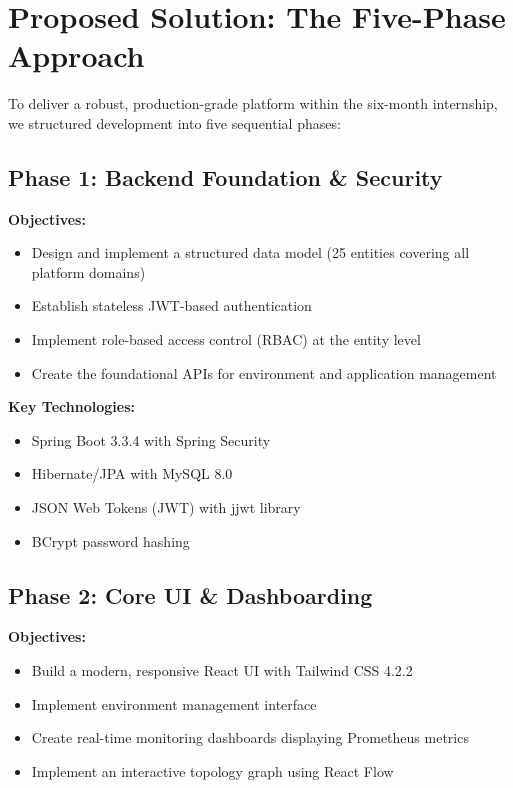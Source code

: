 \documentclass[12pt,a4paper]{report}
\begin{document}
\section{Proposed Solution: The Five-Phase Approach}

To deliver a robust, production-grade platform within the six-month internship, we structured development into five sequential phases:

\subsection{Phase 1: Backend Foundation \& Security}

\textbf{Objectives:}
\begin{itemize}
  \item Design and implement a structured data model (25 entities covering all platform domains)
  \item Establish stateless JWT-based authentication
  \item Implement role-based access control (RBAC) at the entity level
  \item Create the foundational APIs for environment and application management
\end{itemize}

\textbf{Key Technologies:}
\begin{itemize}
  \item Spring Boot 3.3.4 with Spring Security
  \item Hibernate/JPA with MySQL 8.0
  \item JSON Web Tokens (JWT) with jjwt library
  \item BCrypt password hashing
\end{itemize}

\subsection{Phase 2: Core UI \& Dashboarding}

\textbf{Objectives:}
\begin{itemize}
  \item Build a modern, responsive React UI with Tailwind CSS 4.2.2
  \item Implement environment management interface
  \item Create real-time monitoring dashboards displaying Prometheus metrics
  \item Implement an interactive topology graph using React Flow
\end{itemize}
\end{document}
